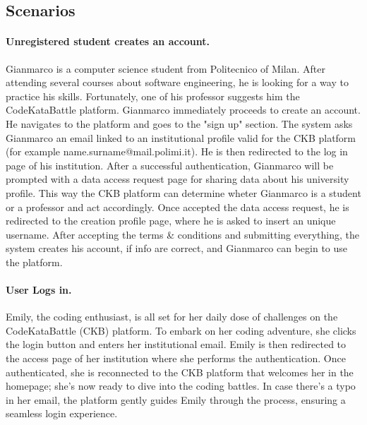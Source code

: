 \subsection{Scenarios}
\label{subsec:scenarios}%

\paragraph{Unregistered student creates an account.}
Gianmarco is a computer science student from Politecnico of Milan. After attending several courses about software engineering, 
he is looking for a way to practice his skills. Fortunately, one of his professor suggests him the CodeKataBattle platform.
Gianmarco immediately proceeds to create an account. He navigates to the platform and goes to the "sign up" section. 
The system asks Gianmarco an email linked 
to an institutional profile valid for the CKB platform (for example name.surname@mail.polimi.it). He is then redirected to the log in page of his institution.  
After a successful authentication, Gianmarco will be prompted with a data access request page for sharing data about his university profile. This way the CKB platform 
can determine wheter Gianmarco is a student or a professor and act accordingly. 
Once accepted the data access request, he is redirected to the creation profile page, where he is asked to insert an unique username. 
After accepting the terms \& conditions 
and submitting everything, the system creates his account, if info are correct, and Gianmarco can begin to use the platform.

\paragraph*{User Logs in.}
Emily, the coding enthusiast, is all set for her daily dose of challenges on the CodeKataBattle (CKB) platform. 
To embark on her coding adventure, she clicks the login button and enters her institutional email.
Emily is then redirected to the access page of her institution where she performs the authentication.
Once authenticated, she is reconnected to the CKB platform that welcomes her in the homepage; she's now ready to dive into the coding battles.
In case there's a typo in her email, the platform gently guides Emily through the process, ensuring a seamless login experience.

